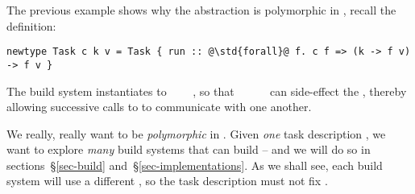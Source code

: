 The previous example shows why the  abstraction is polymorphic in , recall the definition:

\begin{verbatim}
newtype Task c k v = Task { run :: @\std{forall}@ f. c f => (k -> f v) -> f v }
\end{verbatim}

\noindent
The  build system instantiates  to
~~~~,
so that ~\hs{::}~~\hs{->}~~ can side-effect the
, thereby allowing successive calls to  to communicate with
one another.

We really, really want  to be \emph{polymorphic} in .
Given \emph{one} task description , we want to explore \emph{many} build
systems that can build  -- and we will do so in sections~\S\ref{sec-build}
and~\S\ref{sec-implementations}. As we shall see, each build system will use a
different , so the task description must not fix .

